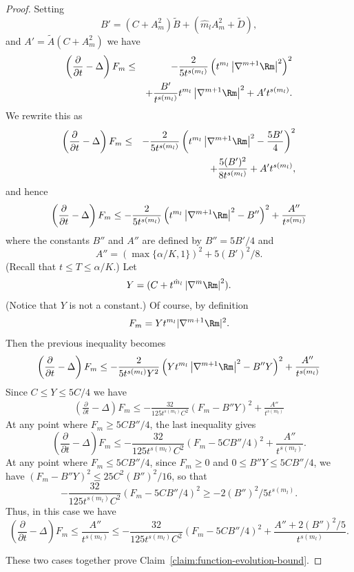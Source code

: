\begin{proof}
Setting
$$B'=(C+A_m^2)\widetilde B+(\hat m_lA_m^2+\widetilde D),$$
and $A'=\widetilde A(C+A_m^2)$ we have
\begin{eqnarray*}
\left(  \frac{\partial}{\partial t}-\Delta\right) F_m  & \leq &
-\frac{2}{5t^{s( m_l)  }
 }\left(t^{m_l}\left\vert\nabla^{m+1}\Rm\right\vert^2\right)^2 \\
 & & +
\frac{B'}{t^{s(m_l)}}t^{m_l}\left\vert\nabla^{m+1}\Rm\right\vert^2
+A't^{s(m_l)}.
\end{eqnarray*}
We rewrite this as
\begin{eqnarray*}
\left(  \frac{\partial}{\partial t}-\Delta\right) F_m & \leq &
-\frac{2}{5t^{s(m_l)}}\left(t^{m_l}\left\vert\nabla^{m+1}\Rm
\right\vert^2   -\frac{5B'}{4}\right)^2
\\ & & +\frac{5(B')^2}{8t^{s(m_l)}} +A't^{s(m_l)},
\end{eqnarray*}
and hence
\begin{equation*}
\left(  \frac{\partial}{\partial t}-\Delta\right) F_m \leq
-\frac{2}{5t^{s(m_l)}}\left(t^{m_l}\left\vert\nabla^{m+1}\Rm
\right\vert^2-B''\right)^2  +\frac{A''}{t^{s(m_l)}}
\end{equation*}
where the constants $B''$ and $A''$ are defined by $ B''=5 B'/4$ and
$$A''=(\max\{\alpha/K,1\})^2+5( B')^2/8.$$ (Recall that $t\le T\le
\alpha/K$.) Let
$$Y=(C+t^{\hat
m_l}\left\vert\nabla^m\Rm\right\vert^2).$$ (Notice
that $Y$ is not a constant.) Of course, by definition
$$F_m=Yt^{m_l}|\nabla^{m+1}\Rm|^2.$$ Then the previous inequality
becomes
\begin{equation*}
\left(\frac{\partial}{\partial t}-\Delta\right)  F_m \leq
-\frac{2}{5t^{s(m_l)}Y^2}\left(Yt^{m_l}\left\vert\nabla^{m+1}\Rm
\right\vert^2-B'' Y\right)^2
 +\frac{A''}{t^{s(m_l)}}
\end{equation*}
Since $C\le Y\le 5C/4$ we have
\begin{eqnarray*}
\left(  \frac{\partial}{\partial t}-\Delta\right)  F_m \leq
-\frac{32}{125t^{s(m_l)}C^2}\left(F_m-B''
Y\right)^2+\frac{A''}{t^{s(m_l)}}
\end{eqnarray*}
At any point where $F_m\ge 5CB''/4$,  the last inequality gives
$$\left(  \frac{\partial}{\partial t}-\Delta\right)  F_m \leq
-\frac{32}{125t^{s(m_l)}C^2}\left(F_m-5CB''/4\right)^2+\frac{A''}{t^{s(m_l)}}.$$
At any point where $F_m\le 5CB''/4$,  since $F_m\ge 0$ and $0\le
B''Y\le 5CB''/4$, we have $(F_m-B''Y)^2\le 25C^2(B'')^2/16$, so that
$$-\frac{32}{125t^{s(m_l)}C^2}\left(F_m-5CB''/4\right)^2\ge
-2(B'')^2/5t^{s(m_l)}.$$ Thus, in this case we have
$$\left(\frac{\partial}{\partial t}-\Delta\right)  F_m \leq
\frac{A''}{t^{s(m_l)}}\le
-\frac{32}{125t^{s(m_l)}C^2}\left(F_m-5CB''/4\right)^2+\frac{A''+2(B'')^2/5}{t^{s(m_l)}}.$$


These two cases together prove Claim~\ref{claim:function-evolution-bound}.
\end{proof}




